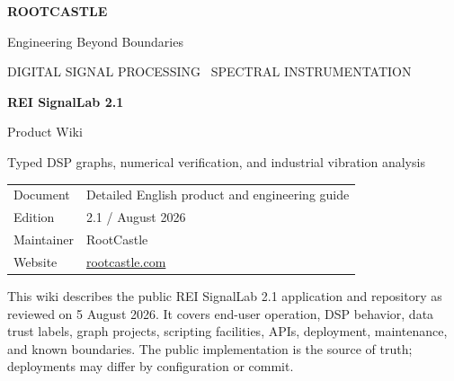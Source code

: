 \documentclass[10pt,a4paper]{article}
\newcommand{\product}{REI SignalLab 2.1}
\begin{document}

\begin{titlepage}
\pagecolor{RCNavy}
\color{white}

\vspace*{12mm}
{\fontsize{16}{18}\selectfont\bfseries ROOTCASTLE}\par
{\color{RCCyan}\large Engineering Beyond Boundaries}\par

\vfill
{\color{RCCyan}\large DIGITAL SIGNAL PROCESSING \textbullet\ SPECTRAL INSTRUMENTATION}\par
\vspace{5mm}
{\fontsize{35}{39}\selectfont\bfseries REI SignalLab 2.1}\par
\vspace{3mm}
{\fontsize{22}{26}\selectfont Product Wiki}\par
\vspace{8mm}
{\large Typed DSP graphs, numerical verification, and industrial vibration analysis}\par

\vfill
\begin{tabular}{@{}ll@{}}
\textcolor{white!60}{Document} & Detailed English product and engineering guide\\
\textcolor{white!60}{Edition} & 2.1 / August 2026\\
\textcolor{white!60}{Maintainer} & RootCastle\\
\textcolor{white!60}{Website} & \href{https://rootcastle.com}{rootcastle.com}
\end{tabular}
\vspace*{18mm}
\end{titlepage}
\nopagecolor
{}

\begin{rcbox}[title={Document scope},fonttitle=\bfseries]
This wiki describes the public \product{} application and repository as reviewed on 5 August 2026. It covers end-user operation, DSP behavior, data trust labels, graph projects, scripting facilities, APIs, deployment, maintenance, and known boundaries. The public implementation is the source of truth; deployments may differ by configuration or commit.
\end{rcbox}
\end{document}
